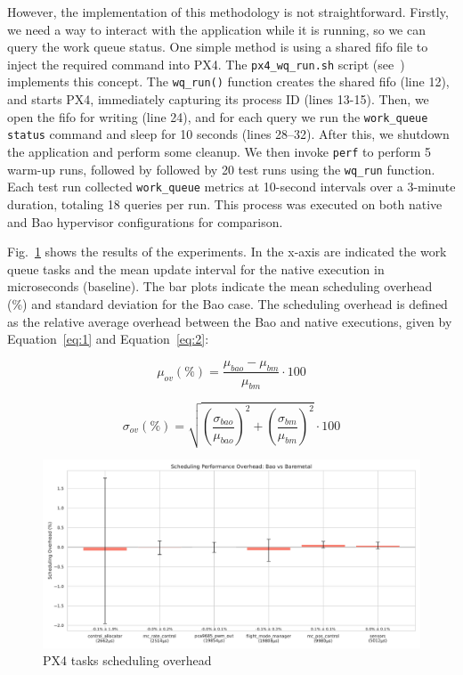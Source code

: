 However, the implementation of this methodology is not straightforward. Firstly,
we need a way to interact with the application while it is running, so we can
query the work queue status. One simple method is using a shared \gls{fifo} file
to inject the required command into PX4. The \lstinline{px4_wq_run.sh} script
(see~\cite{thesis-sw-github}) implements this concept. The \lstinline{wq_run()}
function creates the shared \gls{fifo} (line 12), and starts PX4, immediately
capturing its process ID (lines 13-15). Then, we open the \gls{fifo}
for writing (line 24), and for each query we run the
\lstinline{work_queue status} command and sleep for 10 seconds (lines 28--32). After this, we
shutdown the application and perform some cleanup. We then invoke
\lstinline{perf} to perform 5 warm-up runs, followed by followed by 20 test runs
using the \lstinline{wq_run} function. Each test run collected
\lstinline{work_queue} metrics at 10-second intervals over a 3-minute duration,
totaling 18 queries per run. This process was executed on both native and Bao
hypervisor configurations for comparison.

Fig.~\ref{fig:px4-sched-overhead} shows the results of the experiments. In the
x-axis are indicated the work queue tasks and the mean update interval for the
native execution in microseconds (baseline). The bar plots indicate the mean
scheduling overhead (\%) and standard deviation for the Bao case. The scheduling
overhead is defined as the relative average overhead between the Bao and native
executions, given by Equation~\ref{eq:1} and Equation~\ref{eq:2}:

\begin{equation}
  \label{eq:1}
\mu_{ov} (\%) = \frac{\mu_{bao} - \mu_{bm}}{\mu_{bm}} \cdot 100
\end{equation}

\begin{equation}
  \label{eq:2}
\sigma_{ov} (\%) = \sqrt{ \left(\frac{\sigma_{bao}}{\mu_{bao}}\right)^{2} +
  \left(\frac{\sigma_{bm}}{\mu_{bm}}\right)^{2} } \cdot 100
\end{equation}

\begin{figure}[!hbt]
  \centering
  \includegraphics[width=1.0\textwidth]{./img/pdf/px4-sched-overhead} 
%   
  \caption{PX4 tasks scheduling overhead}%
  \label{fig:px4-sched-overhead}
\end{figure}

